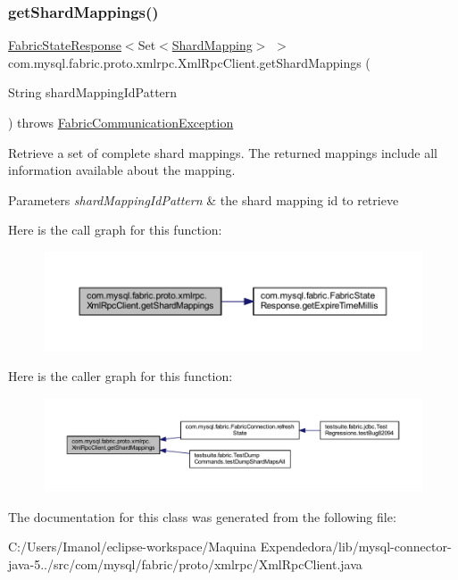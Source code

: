 \subsubsection{\texorpdfstring{get\+Shard\+Mappings()}{getShardMappings()}}
{\footnotesize\ttfamily \mbox{\hyperlink{classcom_1_1mysql_1_1fabric_1_1_fabric_state_response}{Fabric\+State\+Response}}$<$Set$<$\mbox{\hyperlink{classcom_1_1mysql_1_1fabric_1_1_shard_mapping}{Shard\+Mapping}}$>$ $>$ com.\+mysql.\+fabric.\+proto.\+xmlrpc.\+Xml\+Rpc\+Client.\+get\+Shard\+Mappings (\begin{DoxyParamCaption}\item[{String}]{shard\+Mapping\+Id\+Pattern }\end{DoxyParamCaption}) throws \mbox{\hyperlink{classcom_1_1mysql_1_1fabric_1_1_fabric_communication_exception}{Fabric\+Communication\+Exception}}}

Retrieve a set of complete shard mappings. The returned mappings include all information available about the mapping.


\begin{DoxyParams}{Parameters}
{\em shard\+Mapping\+Id\+Pattern} & the shard mapping id to retrieve \\
\hline
\end{DoxyParams}
Here is the call graph for this function\+:\nopagebreak
\begin{figure}[H]
\begin{center}
\leavevmode
\includegraphics[width=350pt]{classcom_1_1mysql_1_1fabric_1_1proto_1_1xmlrpc_1_1_xml_rpc_client_abe45ffddd4ee9cb5dd9aa9a7b38b895c_cgraph}
\end{center}
\end{figure}
Here is the caller graph for this function\+:\nopagebreak
\begin{figure}[H]
\begin{center}
\leavevmode
\includegraphics[width=350pt]{classcom_1_1mysql_1_1fabric_1_1proto_1_1xmlrpc_1_1_xml_rpc_client_abe45ffddd4ee9cb5dd9aa9a7b38b895c_icgraph}
\end{center}
\end{figure}


The documentation for this class was generated from the following file\+:\begin{DoxyCompactItemize}
\item 
C\+:/\+Users/\+Imanol/eclipse-\/workspace/\+Maquina Expendedora/lib/mysql-\/connector-\/java-\/5../src/com/mysql/fabric/proto/xmlrpc/Xml\+Rpc\+Client.\+java\end{DoxyCompactItemize}
